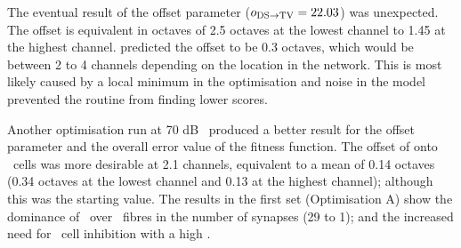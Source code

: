 \smallskip{}

The eventual result of the offset parameter ($\protect o_{\protect\textrm{{DS}}\to\textrm{{TV}}} = 22.03$) was
unexpected. The offset is equivalent in octaves of 2.5 octaves at the lowest
channel to 1.45 at the highest channel. \citet{ReissYoung:2005} predicted the
offset to be 0.3 octaves, which would be between 2 to 4 channels depending on
the location in the network. This is most likely caused by a local minimum in
the optimisation and noise in the model prevented the routine from finding lower
scores.

\smallskip{}

Another optimisation run at 70 dB \SPL~produced a better result for the offset
parameter and the overall error value of the fitness function.  The offset of
\DS onto \TV~cells was more desirable at 2.1 channels, equivalent to a mean of
0.14 octaves (0.34 octaves at the lowest channel and 0.13 at the highest
channel); although this was the starting value.  The results in the first set
(Optimisation A) show the dominance of \LSR~over \HSR~fibres in the number of
synapses (29 to 1); and the increased need for \DS~cell inhibition with a high
\nDSTV.


